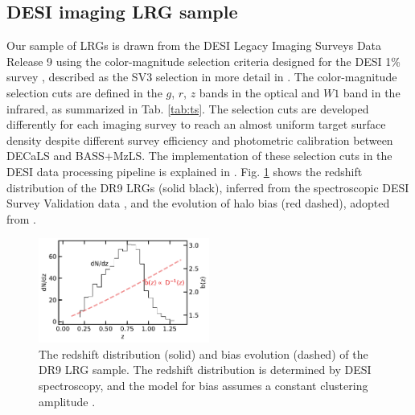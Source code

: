 \subsection{DESI imaging LRG sample}
Our sample of LRGs is drawn from the DESI Legacy Imaging Surveys Data Release 9 \citep[DR9;][]{dey2018overview} using the color-magnitude selection criteria designed for the DESI 1\% survey , described as the SV3 selection in more detail in \cite{zhou2022target}. The color-magnitude selection cuts are defined in the $g$, $r$, $z$ bands in the optical and $W1$ band in the infrared, as summarized in Tab. \ref{tab:ts}. The selection cuts are developed differently for each imaging survey to reach an almost uniform target surface density despite different survey efficiency and photometric calibration between DECaLS and BASS+MzLS. The implementation of these selection cuts in the DESI data processing pipeline is explained in \cite{myers2022}. Fig. \ref{fig:nz} shows the redshift distribution of the DR9 LRGs (solid black), inferred from the spectroscopic DESI Survey Validation data , and the evolution of halo bias (red dashed), adopted from \cite{zhou2021clustering}.

\begin{figure}
 \centering
 \includegraphics[width=0.5\textwidth]{figures/nz_lrg.pdf}
 \caption{The redshift distribution (solid) and bias evolution (dashed) of the DR9 LRG sample. The redshift distribution is determined by DESI spectroscopy, and the model for bias assumes a constant clustering amplitude \citep[see, e.g.,][]{zhou2021clustering, zhou2022target}.}
 \label{fig:nz}
\end{figure}

